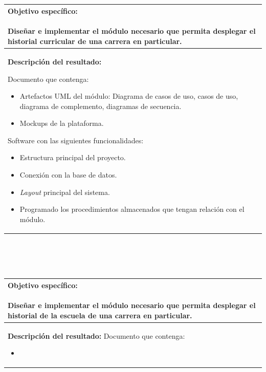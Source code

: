 \documentclass[12pt]{article}
\begin{document}
			 \\ \\  \\ 
			 \begin{tabular}{ |p{15cm}|} \hline
				 \parbox[c]{15cm}{ {\bf Objetivo específico:}\\ \\Diseñar e implementar el módulo necesario que permita desplegar el historial curricular de una carrera en particular.\\} 
			\\
			 \hline
				 \parbox[c]{15cm}{ {\bf Descripción del resultado:}\\ 
				 
			Documento que contenga: \\
				 \begin{itemize}
				  \item Artefactos UML del módulo: Diagrama de casos de uso, casos de uso, diagrama de complemento, diagramas de secuencia.
				  \item Mockups de la plataforma.
				
				 \end{itemize}
			Software con las siguientes funcionalidades:\\
			      \begin{itemize}
							\item Estructura principal del proyecto.
							\item Conexión con la base de datos.
			       \item \textit{Layout} principal del sistema.
						\item Programado los procedimientos almacenados que tengan relación con el módulo.
			     
			      \end{itemize}

				 
				 
				 } 
			 \\ \hline			 
			 \end{tabular}	
			 \\ \\  \\ 
			\begin{tabular}{ |p{15cm}|} \hline
				 \parbox[c]{15cm}{ {\bf Objetivo específico:}\\ \\ Diseñar e implementar el módulo necesario que permita desplegar el historial de la escuela de una carrera en particular.\\} 
			\\
			 \hline
				 \parbox[c]{15cm}{ {\bf Descripción del resultado:}\\ 
				 Documento que contenga: \\
				 \begin{itemize}
				  \item 
				 \end{itemize}

				 
					} 
			 \\ \hline			 
			 \end{tabular}	
\end{document}
